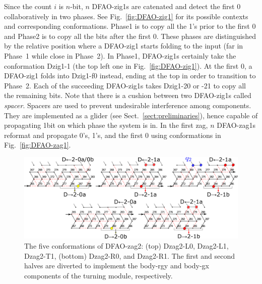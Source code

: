 Since the count $i$ is $n$-bit, $n$ DFAO-zig1s are catenated and detect the first 0 collaboratively in two phases.
See Fig.~\ref{fig:DFAO-zig1} for its possible contexts and corresponding conformations. 
Phase1 is to copy all the 1's prior to the first 0 and Phase2 is to copy all the bits after the first 0.
These phases are distinguished by the relative position where a DFAO-zig1 starts folding to the input (far in Phase~1 while close in Phase~2).
In Phase1, DFAO-zig1s certainly take the conformation Dzig1-1 (the top left one in Fig.~\ref{fig:DFAO-zig1}).
At the first 0, a DFAO-zig1 folds into Dzig1-f0 instead, ending at the top in order to transition to Phase~2.
Each of the succeeding DFAO-zig1s takes Dzig1-20 or -21 to copy all the remaining bits. 
Note that there is a cushion between two DFAO-zig1s called \textit{spacer}.
Spacers are used to prevent undesirable interference among components.
They are implemented as a glider (see Sect.~\ref{sect:preliminaries}), hence capable of propagating 1bit on which phase the system is in.
In the first zag, $n$ DFAO-zag1s reformat and propagate 0's, 1's, and the first 0 using conformations in Fig.~\ref{fig:DFAO-zag1}.




\begin{figure}[h]
\includegraphics[width=\linewidth]{pic/DFAO-zag2.png}
\caption{The five conformations of DFAO-zag2: (top) Dzag2-L0, Dzag2-L1, Dzag2-T1, (bottom) Dzag2-R0, and Dzag2-R1.
The first and second halves are diverted to implement the body-rgy and body-gx components of the turning module, respectively. 
}
\label{fig:DFAO-zag2}
  \end{figure} 

